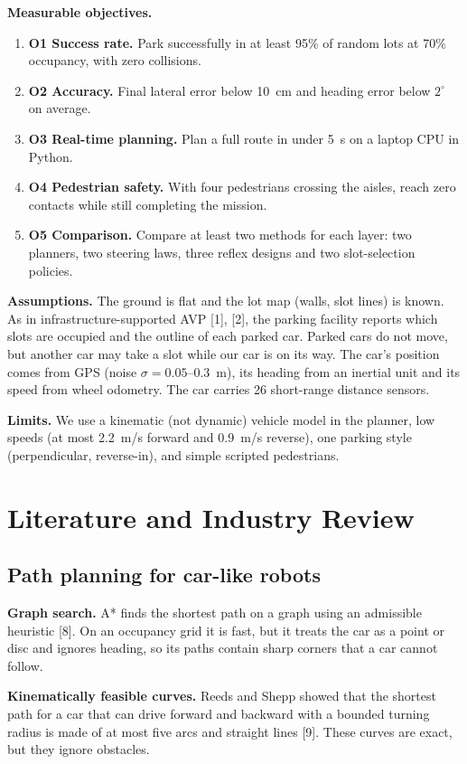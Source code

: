 \documentclass[12pt,a4paper]{article}
\begin{document}
\textbf{Measurable objectives.}
\begin{enumerate}[itemsep=0pt,topsep=2pt]
\item \textbf{O1 Success rate.} Park successfully in at least 95\% of random lots at 70\% occupancy, with zero collisions.
\item \textbf{O2 Accuracy.} Final lateral error below 10~cm and heading error below $2^\circ$ on average.
\item \textbf{O3 Real-time planning.} Plan a full route in under 5~s on a laptop CPU in Python.
\item \textbf{O4 Pedestrian safety.} With four pedestrians crossing the aisles, reach zero contacts while still completing the mission.
\item \textbf{O5 Comparison.} Compare at least two methods for each layer: two planners, two steering laws, three reflex designs and two slot-selection policies.
\end{enumerate}

\textbf{Assumptions.} The ground is flat and the lot map (walls, slot lines) is known. As in infrastructure-supported AVP [1], [2], the parking facility reports which slots are occupied and the outline of each parked car. Parked cars do not move, but another car may take a slot while our car is on its way. The car's position comes from GPS (noise $\sigma = 0.05$--$0.3$~m), its heading from an inertial unit and its speed from wheel odometry. The car carries 26 short-range distance sensors.

\textbf{Limits.} We use a kinematic (not dynamic) vehicle model in the planner, low speeds (at most 2.2~m/s forward and 0.9~m/s reverse), one parking style (perpendicular, reverse-in), and simple scripted pedestrians.

\section{Literature and Industry Review}
\subsection{Path planning for car-like robots}
\textbf{Graph search.} A* finds the shortest path on a graph using an admissible heuristic [8]. On an occupancy grid it is fast, but it treats the car as a point or disc and ignores heading, so its paths contain sharp corners that a car cannot follow.

\textbf{Kinematically feasible curves.} Reeds and Shepp showed that the shortest path for a car that can drive forward and backward with a bounded turning radius is made of at most five arcs and straight lines [9]. These curves are exact, but they ignore obstacles.
\end{document}
